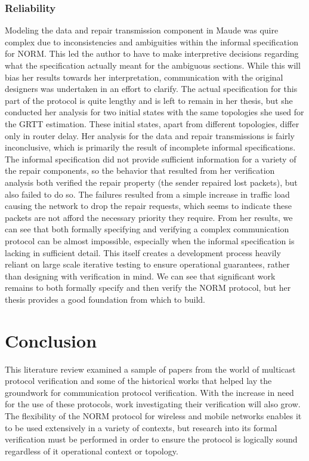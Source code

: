 \documentclass[12pt, fullpage]{article}
\begin{document}
\subsubsection{Reliability}
Modeling the data and repair transmission component in Maude was quire complex due to inconsistencies and ambiguities within the informal specification for NORM. This led the author to have to make interpretive decisions regarding what the specification actually meant for the ambiguous sections. While this will bias her results towards her interpretation, communication with the original designers was undertaken in an effort to clarify. The actual specification for this part of the protocol is quite lengthy and is left to remain in her thesis, but  she conducted her analysis for two initial states with the same topologies she used for the GRTT estimation. These initial states, apart from different topologies, differ only in router delay.
\bigbreak
Her analysis for the data and repair transmissions is fairly inconclusive, which is primarily the result of incomplete informal specifications. The informal specification did not provide sufficient information for a variety of the repair components, so the behavior that resulted from her verification analysis both verified the repair property (the sender repaired lost packets), but also failed to do so. The failures resulted from a simple increase in traffic load causing the network to drop the repair requests, which seems to indicate these packets are not afford the necessary priority they require.
\bigbreak
From her results, we can see that both formally specifying and verifying a complex communication protocol can be almost impossible, especially when the informal specification is lacking in sufficient detail. This itself creates a development process heavily reliant on large scale iterative testing to ensure operational guarantees, rather than designing with verification in mind. We can see that significant work remains to both formally specify and then verify the NORM protocol, but her thesis provides a good foundation from which to build.
\bigbreak
\section{Conclusion}
This literature review examined a sample of papers from the world of multicast protocol verification and some of the historical works that helped lay the groundwork for communication protocol verification. With the increase in need for the use of these protocols, work investigating their verification will also grow. The flexibility of the NORM protocol for wireless and mobile networks enables it to be used extensively in a variety of contexts, but research into its formal verification must be performed in order to ensure the protocol is logically sound regardless of it operational context or topology. 


\end{document}
